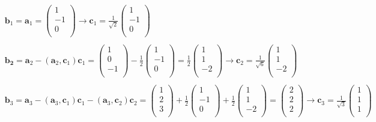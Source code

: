 \documentclass[dvipdfmx,uplatex,11pt]{jsarticle}
\theoremstyle{definition}
\begin{document}
\begin{eqnarray*}
& \bm{b}_1=\bm{a}_1=
\begin{pmatrix}
1 \\
-1 \\
0 \\
\end{pmatrix}
\longrightarrow
\bm{c}_1=\frac{1}{\sqrt{2}}
\begin{pmatrix}
1 \\
-1 \\
0 \\
\end{pmatrix}
\\ \\
& \bm{b_2}=\bm{a}_2-(\bm{a}_2, \bm{c}_1)\bm{c}_1=
\begin{pmatrix}
1 \\
0 \\
-1 \\
\end{pmatrix}
-\frac{1}{2}
\begin{pmatrix}
1 \\
-1 \\
0 \\
\end{pmatrix}
=\frac{1}{2}
\begin{pmatrix}
1 \\
1 \\
-2 \\
\end{pmatrix}
\longrightarrow
\bm{c}_2 =\frac{1}{\sqrt{6}}
\begin{pmatrix}
1 \\
1 \\
-2 \\
\end{pmatrix}
\\ \\
& \bm{b}_3=\bm{a}_3-(\bm{a}_3, \bm{c}_1)\bm{c}_1 -(\bm{a}_3, \bm{c}_2)\bm{c}_2=
\begin{pmatrix}
1 \\
2 \\
3 \\
\end{pmatrix}
+\frac{1}{2}
\begin{pmatrix}
1 \\
-1 \\
0 \\
\end{pmatrix}
+\frac{1}{2}
\begin{pmatrix}
1 \\
1 \\
-2 \\
\end{pmatrix}
=
\begin{pmatrix}
2 \\
2 \\
2 \\
\end{pmatrix}
\longrightarrow 
\bm{c}_3 =\frac{1}{\sqrt{3}}
\begin{pmatrix}
1 \\
1 \\
1 \\
\end{pmatrix}
\end{eqnarray*}
\end{document}

